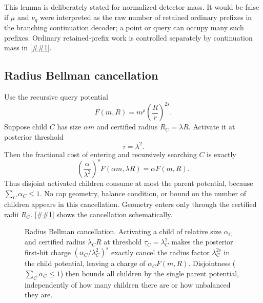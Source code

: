 \documentclass[10pt]{article}
\newcommand{\cref}[1]{\ref{##1}}
\newcommand{\Cref}[1]{\ref{##1}}
\theoremstyle{definition}
\begin{document}
This lemma is deliberately stated for normalized detector mass. It would be false if $\mu$ and $\nu_q$ were interpreted as the raw number of retained ordinary prefixes in the branching continuation decoder; a point or query can occupy many such prefixes. Ordinary retained-prefix work is controlled separately by continuation mass in \cref{lem:continuation-work}.

\subsection{Radius Bellman cancellation}

Use the recursive query potential
\[
   F(m,R)=m^\rho\left(\frac Rr\right)^{2s}.
\]
Suppose child $C$ has size $\alpha m$ and certified radius $R_C=\lambda R$. Activate it at posterior threshold
\[
   \tau=\lambda^2.
\]
Then the fractional cost of entering and recursively searching $C$ is exactly
\[
   \left(\frac{\alpha}{\lambda^2}\right)^s
   F(\alpha m,\lambda R)
   =
   \alpha F(m,R).
\]
Thus disjoint activated children consume at most the parent potential, because $\sum_C\alpha_C\le1$. No cap geometry, balance condition, or bound on the number of children appears in this cancellation. Geometry enters only through the certified radii $R_C$. \Cref{fig:bellman} shows the cancellation schematically.

\begin{figure}[t]\centering
{}
\caption{Radius Bellman cancellation. Activating a child of relative size $\alpha_C$ and certified radius $\lambda_C R$ at threshold $\tau_C=\lambda_C^2$ makes the posterior first-hit charge $(\alpha_C/\lambda_C^2)^s$ exactly cancel the radius factor $\lambda_C^{2s}$ in the child potential, leaving a charge of $\alpha_C F(m,R)$. Disjointness ($\sum_C\alpha_C\le1$) then bounds all children by the single parent potential, independently of how many children there are or how unbalanced they are.}
\label{fig:bellman}
\end{figure}
\end{document}
